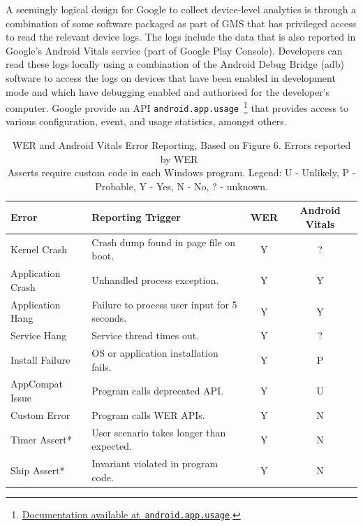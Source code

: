 A seemingly logical design for Google to collect device-level analytics is through a combination of some software packaged as part of GMS that has privileged access to read the relevant device logs. The logs include the data that is also reported in Google's Android Vitals service (part of Google Play Console). Developers can read these logs locally using a combination of the Android Debug Bridge (adb) software to access the logs on devices that have been enabled in development mode and which have debugging enabled and authorised for the developer's computer. Google provide an API \texttt{android.app.usage}~\footnote{\href{https://developer.android.com/reference/android/app/usage/package-summary.html}{Documentation available at~\texttt{android.app.usage}}.} that provides access to various configuration, event, and usage statistics, amongst others.

\begin{table}
    \centering
    \small\addtolength{\tabcolsep}{-6pt} %
    \begin{tabular}{llcc}
         Error             &Reporting Trigger  &WER &Android Vitals \\
         \hline
         Kernel Crash      &Crash dump found in page file on boot. &Y &? \\ 
         Application Crash &Unhandled process exception. &Y &Y \\
         \hline
         Application Hang  &Failure to process user input for 5 seconds. &Y &Y \\
         Service Hang      &Service thread times out. &Y &? \\
         \hline
         Install Failure   &OS or application installation fails. &Y &P \\
         AppCompat Issue   &Program calls deprecated API. &Y &U \\
         Custom Error      &Program calls WER APIs. &Y &N \\
         \hline
         Timer Assert* &User scenario takes longer than expected. &Y &N \\
         Ship Assert* &Invariant violated in program code. &Y &N\\
    \end{tabular}
    \caption[WER and Android Vitals Error Reporting]{WER and Android Vitals Error Reporting, Based on Figure 6. Errors reported by WER~\citep{kinshuman2009_debugging_in_the_very_large} \\ \footnotesize *Asserts require custom code in each Windows program. Legend: U - Unlikely, P - Probable, Y - Yes, N - No, ? - unknown.}
    \label{tab:wer-and-android-vitals-errors}
\end{table}

